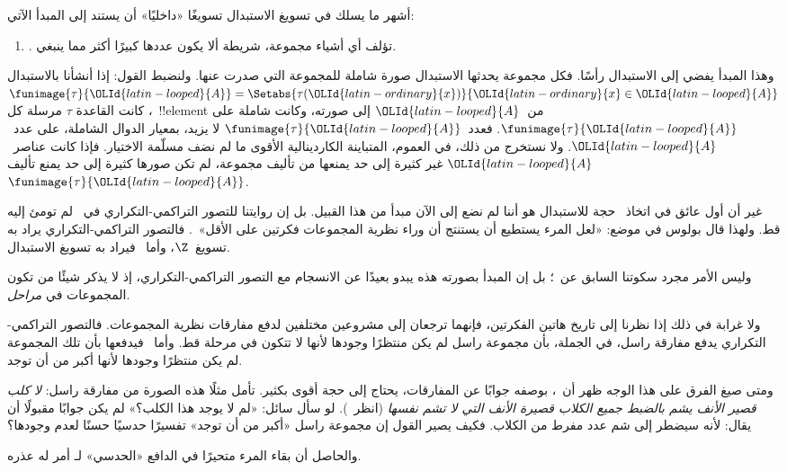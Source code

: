 \documentclass[../../../include/open-logic-section]{subfiles}
\begin{document}

أشهر ما يسلك في تسويغ الاستبدال تسويغًا «داخليًا» أن يستند إلى
المبدأ الآتي:
\begin{enumerate}
	\item[] \limofsize. تؤلف أي أشياء مجموعة، شريطة ألا يكون عددها
	كبيرًا أكثر مما ينبغي.
\end{enumerate}
وهذا المبدأ يفضي إلى الاستبدال رأسًا. فكل مجموعة يحدثها الاستبدال صورة
شاملة للمجموعة التي صدرت عنها. ولنضبط القول: إذا أنشأنا بالاستبدال
$\funimage{\tau}{{\OLId{latin-looped}{A}}} = \Setabs{\tau({\OLId{latin-ordinary}{x}})}{{\OLId{latin-ordinary}{x}} \in {\OLId{latin-looped}{A}}}$، كانت القاعدة
$\tau$ مرسلة كل~!!{element} من~${\OLId{latin-looped}{A}}$ إلى صورته، وكانت شاملة على
$\funimage{\tau}{{\OLId{latin-looped}{A}}}$. فعدد~$\funimage{\tau}{{\OLId{latin-looped}{A}}}$ لا يزيد، بمعيار
الدوال الشاملة، على عدد~${\OLId{latin-looped}{A}}$. ولا نستخرج من ذلك، في العموم، المتباينة
الكاردينالية الأقوى ما لم نضف مسلّمة الاختيار. فإذا كانت عناصر~${\OLId{latin-looped}{A}}$
غير كثيرة إلى حد يمنعها من تأليف مجموعة، لم تكن صورها كثيرة إلى حد
يمنع تأليف~$\funimage{\tau}{{\OLId{latin-looped}{A}}}$.

غير أن أول عائق في اتخاذ~\limofsize{} حجة للاستبدال هو أننا لم نضع
إلى الآن مبدأ من هذا القبيل. بل إن روايتنا للتصور التراكمي-التكراري
في~ لم تومئ إليه قط. ولهذا
قال بولوس في موضع: «لعل المرء يستطيع أن يستنتج أن وراء نظرية
المجموعات فكرتين على الأقل»~\citeyearpar[p.~19]{Boolos1989}. فالتصور
التراكمي-التكراري يراد به تسويغ~$\Z$، وأما~\limofsize{} فيراد به
تسويغ الاستبدال.

وليس الأمر مجرد سكوتنا السابق عن~\limofsize؛ بل إن المبدأ بصورته
هذه يبدو بعيدًا عن الانسجام مع التصور التراكمي-التكراري، إذ لا يذكر
شيئًا من تكون المجموعات في \emph{مراحل}.

ولا غرابة في ذلك إذا نظرنا إلى تاريخ هاتين الفكرتين، فإنهما ترجعان
إلى مشروعين مختلفين لدفع مفارقات نظرية المجموعات. فالتصور
التراكمي-التكراري يدفع مفارقة راسل، في الجملة، بأن مجموعة راسل لم يكن
منتظرًا وجودها لأنها لا تتكون في مرحلة قط. وأما~\limofsize{} فيدفعها
بأن تلك المجموعة لم يكن منتظرًا وجودها لأنها أكبر من أن توجد.

ومتى صيغ الفرق على هذا الوجه ظهر أن~\limofsize{}، بوصفه جوابًا عن
المفارقات، يحتاج إلى حجة أقوى بكثير. تأمل مثلًا هذه الصورة من مفارقة
راسل: \emph{لا كلب قصير الأنف يشم بالضبط جميع الكلاب قصيرة الأنف
التي لا تشم نفسها} (انظر~). لو سأل سائل:
«لم لا يوجد هذا الكلب؟» لم يكن جوابًا مقبولًا أن يقال: لأنه سيضطر إلى
شم عدد مفرط من الكلاب. فكيف يصير القول إن مجموعة راسل «أكبر من أن
توجد» تفسيرًا حدسيًا حسنًا لعدم وجودها؟

والحاصل أن بقاء المرء متحيرًا في الدافع «الحدسي» لـ\limofsize{} أمر
له عذره.
\end{document}
